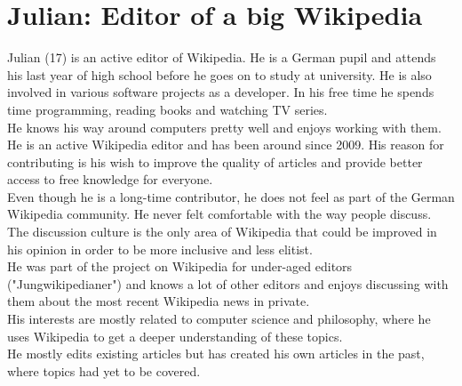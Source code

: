 \section{Julian: Editor of a big Wikipedia}
Julian (17) is an active editor of Wikipedia. He is a German pupil and attends his last year of high school before he goes on to study at university. He is also involved in various software projects as a developer. In his free time he spends time programming, reading books and watching TV series. \\
He knows his way around computers pretty well and enjoys working with them. \\
He is an active Wikipedia editor and has been around since 2009. His reason for contributing is his wish to improve the quality of articles and provide better access to free knowledge for everyone. \\
Even though he is a long-time contributor, he does not feel as part of the German Wikipedia community. He never felt comfortable with the way people discuss. The discussion culture is the only area of Wikipedia that could be improved in his opinion in order to be more inclusive and less elitist. \\
He was part of the project on Wikipedia for under-aged editors ("Jungwikipedianer") and knows a lot of other editors and enjoys discussing with them about the most recent Wikipedia news in private. \\
His interests are mostly related to computer science and philosophy, where he uses Wikipedia to get a deeper understanding of these topics. \\
He mostly edits existing articles but has created his own articles in the past, where topics had yet to be covered.

